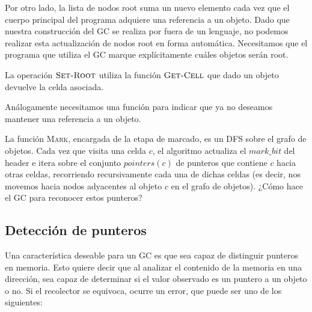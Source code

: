 Por otro lado, la lista de nodos root suma un nuevo elemento cada vez que el cuerpo principal del programa adquiere una referencia a un objeto. Dado que nuestra construcción del GC se realiza por fuera de un lenguaje, no podemos realizar esta actualización de nodos root en forma automática. Necesitamos que el programa que utiliza el GC marque explícitamente cuáles objetos serán root.

\begin{algorithm}
	\dontprintsemicolon
	\Output{-}
 	\BlankLine
\caption{$\textsc{Set-Root}$}
\label{algo:algoritmo10}
\end{algorithm}

La operación $\textsc{Set-Root}$ utiliza la función $\textsc{Get-Cell}$ que dado un objeto devuelve la celda asociada.

Análogamente necesitamos una función para indicar que ya no deseamos mantener una referencia a un objeto.

\begin{algorithm}
	\dontprintsemicolon
	\Output{-}
 	\BlankLine
\caption{$\textsc{Set-Null}$}
\label{algo:algoritmo11}
\end{algorithm}

La función \textsc{Mark}, encargada de la etapa de marcado, es un DFS sobre el grafo de objetos. Cada vez que visita una celda $c$, el algoritmo actualiza el $mark\_bit$ del header e itera sobre el conjunto $pointers(c)$ de punteros que contiene $c$ hacia otras celdas, recorriendo recursivamente cada una de dichas celdas (es decir, nos movemos hacia nodos adyacentes al objeto $c$ en el grafo de objetos). ¿Cómo hace el GC para reconocer estos punteros?

\subsection{Detección de punteros}

Una característica deseable para un GC es que sea capaz de distinguir punteros en memoria. Esto quiere decir que al analizar el contenido de la memoria en una dirección, sea capaz de determinar si el valor observado es un puntero a un objeto o no. Si el recolector se equivoca, ocurre un error, que puede ser uno de los siguientes:

